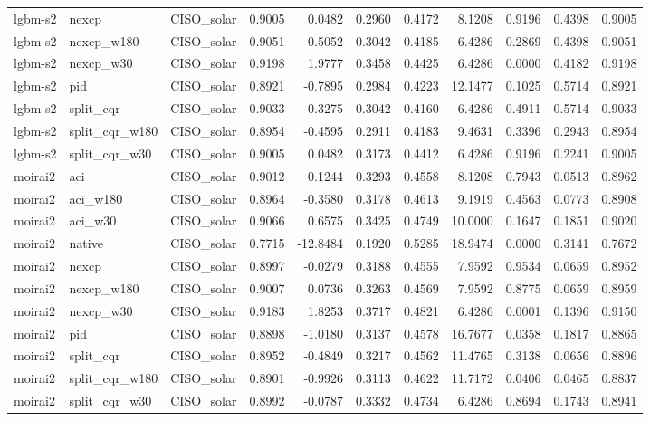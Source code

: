 \begin{tabular}{lllrrrrrrrr}
lgbm-s2 & nexcp & CISO_solar & 0.9005 & 0.0482 & 0.2960 & 0.4172 & 8.1208 & 0.9196 & 0.4398 & 0.9005 \\
lgbm-s2 & nexcp_w180 & CISO_solar & 0.9051 & 0.5052 & 0.3042 & 0.4185 & 6.4286 & 0.2869 & 0.4398 & 0.9051 \\
lgbm-s2 & nexcp_w30 & CISO_solar & 0.9198 & 1.9777 & 0.3458 & 0.4425 & 6.4286 & 0.0000 & 0.4182 & 0.9198 \\
lgbm-s2 & pid & CISO_solar & 0.8921 & -0.7895 & 0.2984 & 0.4223 & 12.1477 & 0.1025 & 0.5714 & 0.8921 \\
lgbm-s2 & split_cqr & CISO_solar & 0.9033 & 0.3275 & 0.3042 & 0.4160 & 6.4286 & 0.4911 & 0.5714 & 0.9033 \\
lgbm-s2 & split_cqr_w180 & CISO_solar & 0.8954 & -0.4595 & 0.2911 & 0.4183 & 9.4631 & 0.3396 & 0.2943 & 0.8954 \\
lgbm-s2 & split_cqr_w30 & CISO_solar & 0.9005 & 0.0482 & 0.3173 & 0.4412 & 6.4286 & 0.9196 & 0.2241 & 0.9005 \\
moirai2 & aci & CISO_solar & 0.9012 & 0.1244 & 0.3293 & 0.4558 & 8.1208 & 0.7943 & 0.0513 & 0.8962 \\
moirai2 & aci_w180 & CISO_solar & 0.8964 & -0.3580 & 0.3178 & 0.4613 & 9.1919 & 0.4563 & 0.0773 & 0.8908 \\
moirai2 & aci_w30 & CISO_solar & 0.9066 & 0.6575 & 0.3425 & 0.4749 & 10.0000 & 0.1647 & 0.1851 & 0.9020 \\
moirai2 & native & CISO_solar & 0.7715 & -12.8484 & 0.1920 & 0.5285 & 18.9474 & 0.0000 & 0.3141 & 0.7672 \\
moirai2 & nexcp & CISO_solar & 0.8997 & -0.0279 & 0.3188 & 0.4555 & 7.9592 & 0.9534 & 0.0659 & 0.8952 \\
moirai2 & nexcp_w180 & CISO_solar & 0.9007 & 0.0736 & 0.3263 & 0.4569 & 7.9592 & 0.8775 & 0.0659 & 0.8959 \\
moirai2 & nexcp_w30 & CISO_solar & 0.9183 & 1.8253 & 0.3717 & 0.4821 & 6.4286 & 0.0001 & 0.1396 & 0.9150 \\
moirai2 & pid & CISO_solar & 0.8898 & -1.0180 & 0.3137 & 0.4578 & 16.7677 & 0.0358 & 0.1817 & 0.8865 \\
moirai2 & split_cqr & CISO_solar & 0.8952 & -0.4849 & 0.3217 & 0.4562 & 11.4765 & 0.3138 & 0.0656 & 0.8896 \\
moirai2 & split_cqr_w180 & CISO_solar & 0.8901 & -0.9926 & 0.3113 & 0.4622 & 11.7172 & 0.0406 & 0.0465 & 0.8837 \\
moirai2 & split_cqr_w30 & CISO_solar & 0.8992 & -0.0787 & 0.3332 & 0.4734 & 6.4286 & 0.8694 & 0.1743 & 0.8941 \\

\end{tabular}
